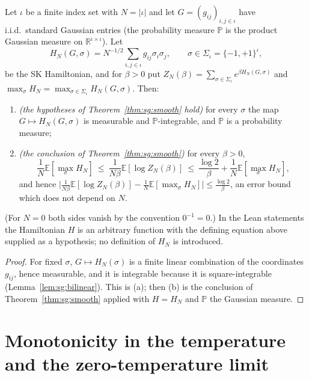 \begin{theorem}\label{thm:sg:sksmooth}
  \leanok
Let $\iota$ be a finite index set with $N=|\iota|$ and let $G=(g_{ij})_{i,j\in\iota}$ have i.i.d.\ standard Gaussian entries (the probability measure $\mathbb P$ is the product Gaussian measure on $\mathbb R^{\iota\times\iota}$). Let
\[H_N(G,\sigma)=N^{-1/2}\sum_{i,j\in\iota}g_{ij}\sigma_i\sigma_j,\qquad\sigma\in\Sigma_\iota=\{-1,+1\}^\iota,\]
be the SK Hamiltonian, and for $\beta>0$ put $Z_N(\beta)=\sum_{\sigma\in\Sigma_\iota}e^{\beta H_N(G,\sigma)}$ and $\max_\sigma H_N=\max_{\sigma\in\Sigma_\iota}H_N(G,\sigma)$. Then:
\begin{enumerate}
\item[(a)] \emph{(the hypotheses of Theorem~\ref{thm:sg:smooth} hold)} for every $\sigma$ the map $G\mapsto H_N(G,\sigma)$ is measurable and $\mathbb P$-integrable, and $\mathbb P$ is a probability measure;
\item[(b)] \emph{(the conclusion of Theorem~\ref{thm:sg:smooth})} for every $\beta>0$,
\[\frac1N\mathbb E[\max_\sigma H_N]\ \le\ \frac1{N\beta}\mathbb E[\log Z_N(\beta)]\ \le\ \frac{\log2}{\beta}+\frac1N\mathbb E[\max_\sigma H_N],\]
and hence $\Big|\frac1{N\beta}\mathbb E[\log Z_N(\beta)]-\frac1N\mathbb E[\max_\sigma H_N]\Big|\le\frac{\log2}{\beta}$, an error bound which does not depend on $N$.
\end{enumerate}
(For $N=0$ both sides vanish by the convention $0^{-1}=0$.) In the Lean statements the Hamiltonian $H$ is an arbitrary function with the defining equation above supplied as a hypothesis; no definition of $H_N$ is introduced.
\end{theorem}

\begin{proof}
  \leanok
For fixed $\sigma$, $G\mapsto H_N(\sigma)$ is a finite linear combination of the coordinates $g_{ij}$, hence
measurable, and it is integrable because it is square-integrable (Lemma~\ref{lem:sg:bilinear}). This is (a); then (b) is the conclusion of Theorem~\ref{thm:sg:smooth} applied with $H=H_N$ and $\mathbb P$ the Gaussian measure.
\end{proof}

\section{Monotonicity in the temperature and the zero-temperature limit}\label{sec:sg:thermo}

